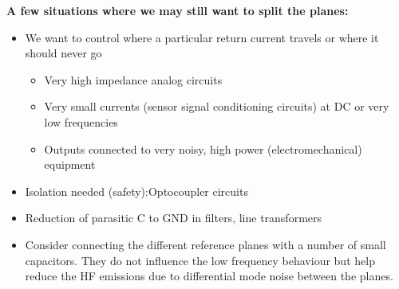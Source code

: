 		\textbf{A few situations where we may still want to split the planes:}
		\begin{itemize}
			\item We want to control where a particular return current travels or where it should never go
			\begin{itemize}
				\item Very high impedance analog circuits
				\item Very small currents (sensor signal conditioning circuits) at DC or very low frequencies
				\item Outputs connected to very noisy, high power (electromechanical) equipment
			\end{itemize}
			\item Isolation needed (safety):Optocoupler circuits
			\item Reduction of parasitic C to GND in filters, line transformers
			\item Consider connecting the different reference planes with a number of small capacitors. They do not influence the low frequency behaviour but help reduce the HF emissions due to differential mode noise between the planes. 
		\end{itemize}
		\clearpage
